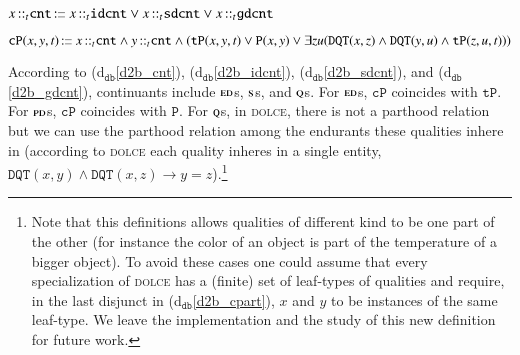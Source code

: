 \documentclass[ao]{iosart2x}
\newcommand{\dbDefLabel}{\textrm{d$_\texttt{db}$}}
\newcounter{cntdbdf}
\newcommand{\dbdf}[1]{\refstepcounter{cntdbdf}\begin{small}{\bf \dbDefLabel\thecntdbdf\label{#1}}\end{small}}
\newcommand{\refdbdf}[1]{({\dbDefLabel}\ref{#1})}
\newcommand{\pr}[1]{\mathtt{#1}}
\newcommand{\cn}[1]{\mathtt{#1}}
\newcommand\textequal{%
 \rule[.08ex]{5pt}{0.35pt}\llap{\rule[.78ex]{5pt}{0.35pt}}}
\newcommand{\sdef}{{\hspace{1.5pt}:\hspace{-2.5pt}\textequal\hspace{3pt}}}
\newcommand{\dolce}{{\textsc{dolce}}}
\newcommand {\EDdcat} {\textsc{ed}}
\newcommand {\NPEDdcat} {\textsc{nped}}
\newcommand {\PDdcat} {\textsc{pd}}
\newcommand {\Qdcat} {\textsc{q}}
\newcommand {\Sdcat} {\textsc{s}}
\newcommand {\TPd} {\ensuremath{\pr{tP}}}
\newcommand {\Pd} {\ensuremath{\pr{P}}}
\newcommand {\PREd} {\ensuremath{\pr{PRE}}}
\newcommand {\DQTd} {\ensuremath{\pr{DQT}}}
\newcommand {\EXDd} {\ensuremath{\pr{EXD}}}
\newcommand{\cntbcat}{\cn{cnt}}
\newcommand{\idcntbcat}{\cn{idcnt}}
\newcommand{\gdcntbcat}{\cn{gdcnt}}
\newcommand{\sdcntbcat}{\cn{sdcnt}}
\newcommand{\sregbcat}{\cn{sreg}}
\newcommand{\bfocpart}{\pr{cP}}
\newcommand{\bfoiof}[1]{{\,::_{#1\:\!}}}
\begin{document}
\item[\dbdf{d2b_cnt}] $x \bfoiof{t} \cntbcat \sdef x \bfoiof{t} \idcntbcat \lor x \bfoiof{t} \sdcntbcat \lor x \bfoiof{t} \gdcntbcat$

%

\item[\dbdf{d2b_cpart}] $\bfocpart(x,y,t) \sdef x \bfoiof{t} \cntbcat \land y \bfoiof{t} \cntbcat \land (\TPd(x,y,t) \lor \Pd(x,y) \lor \exists zu(\DQTd(x,z) \land \DQTd(y,u) \land \TPd(z,u,t)))$

\vspace{1pt}
According to \refdbdf{d2b_cnt}, \refdbdf{d2b_idcnt}, \refdbdf{d2b_sdcnt}, and \refdbdf{d2b_gdcnt}, continuants include $\EDdcat$s, $\Sdcat$s, and $\Qdcat$s. For $\EDdcat$s, $\bfocpart$ coincides with $\TPd$. For $\PDdcat$s, $\bfocpart$ coincides with $\Pd$. For $\Qdcat$s, in {\dolce}, there is not a parthood relation but we can use the parthood relation among the endurants these qualities inhere in (according to {\dolce} each quality inheres in a single entity,  $\DQTd(x,y) \land \DQTd(x,z) \to y=z$).\footnote{Note that this definitions allows qualities of different kind to be one part of the other (for instance the color of an object is part of the temperature of a bigger object). To avoid these cases one could assume that every specialization of {\dolce} has a (finite) set of leaf-types of qualities and require, in the last disjunct in \refdbdf{d2b_cpart}, $x$ and $y$ to be instances of the same leaf-type. We leave the  implementation and the study of this new definition for future work.}
\end{document}
